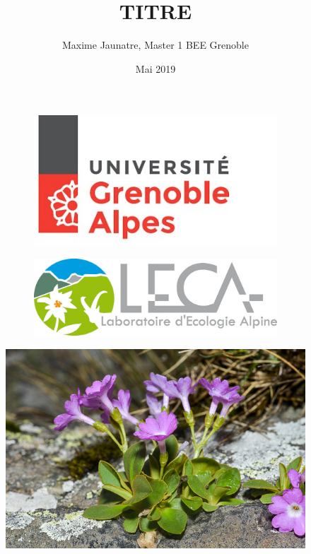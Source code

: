 \documentclass[12pt,a4paper,notitlepage]{article}
\title{TITRE}
\author{Maxime Jaunatre, Master 1 BEE Grenoble}
\date{Mai 2019}
\begin{document}
\begin{titlepage} %

\begin{figure}
\centering
\begin{subfigure}{.5\textwidth}
  \centering
  \includegraphics[width=.8\linewidth]{fig/UGA.jpg}
  \label{fig:sub1}
\end{subfigure}%
\begin{subfigure}{.5\textwidth}
  \centering
  \includegraphics[width=.8\linewidth]{fig/leca.jpg}
  \label{fig:sub2}
\end{subfigure}
\label{fig:test}
\end{figure}

\maketitle

\begin{figure}[h]
\begin{center}
\includegraphics[scale=3]{fig/primulapedemontana_7.jpg}
\end{center}
\end{figure}


\end{titlepage}
\end{document}
